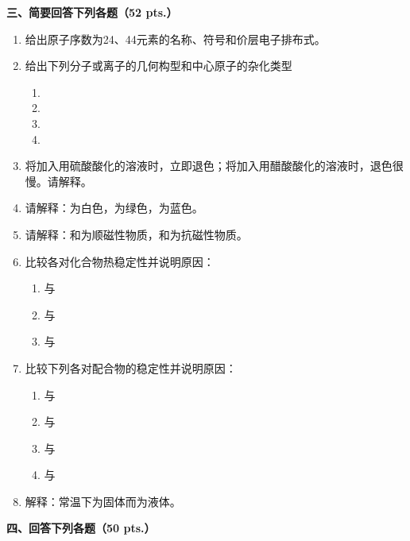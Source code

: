 \vspace{0.5cm}
\noindent\textbf{三、简要回答下列各题（52 pts.）}

\begin{enumerate}[label=\arabic*., start=11, itemsep=1.5ex]
    \item 给出原子序数为24、44元素的名称、符号和价层电子排布式。
    \item 给出下列分子或离子的几何构型和中心原子的杂化类型
    \begin{enumerate}[label=(\arabic*), itemsep=1ex]
        \item {}
        \item {}
        \item {}
        \item {}
    \end{enumerate}
    \item 将加入用硫酸酸化的溶液时，立即退色；将加入用醋酸酸化的溶液时，退色很慢。请解释。
    \item 请解释：为白色，为绿色，为蓝色。
    \item 请解释：和为顺磁性物质，和为抗磁性物质。
    \item 比较各对化合物热稳定性并说明原因：
    \begin{enumerate}[label=(\arabic*), itemsep=1ex]
        \item {}与
        \item {}与
        \item {}与
    \end{enumerate}
    \item 比较下列各对配合物的稳定性并说明原因：
    \begin{enumerate}[label=(\arabic*), itemsep=1ex]
        \item {}与
        \item {}与\ce{[Cu(NH3)4]^{+}}
        \item {}与
        \item {}与
    \end{enumerate}
    \item 解释：常温下为固体而为液体。
\end{enumerate}

\vspace{0.5cm}
\noindent\textbf{四、回答下列各题（50 pts.）}

